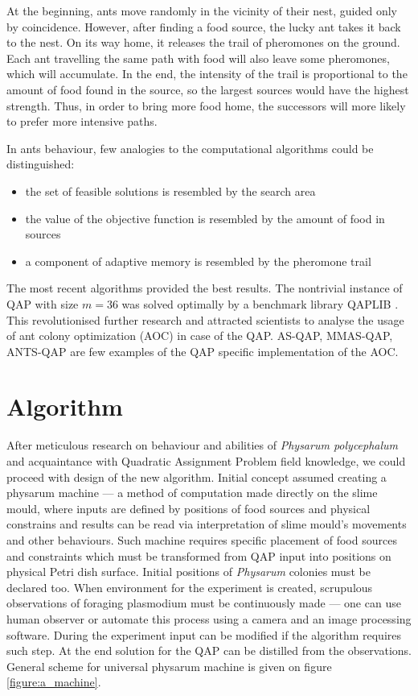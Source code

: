 \documentclass[english,a4paper,twoside]{ppfcmthesis}
\begin{document}
At the beginning, ants move randomly in the vicinity of their nest, guided only by coincidence.
However, after finding a food source, the lucky ant takes it back to the nest.
On its way home, it releases the trail of pheromones on the ground.
Each ant travelling the same path with food will also leave some pheromones, which will accumulate.
In the end, the intensity of the trail is proportional to the amount of food found in the source, so the largest sources would have the highest strength.
Thus, in order to bring more food home, the successors will more likely to prefer more intensive paths.

In ants behaviour, few analogies to the computational algorithms could be distinguished:
\begin{itemize}
  \item the set of feasible solutions is resembled by the search area
  \item the value of the objective function is resembled by the amount of food in sources
  \item a component of adaptive memory is resembled by the pheromone trail
\end{itemize}

The most recent algorithms provided the best results.
The nontrivial instance of QAP with size $ m = 36 $ was solved optimally by a benchmark library QAPLIB \cite{dorigo2004ant}.
This revolutionised further research and attracted scientists to analyse the usage of ant colony optimization (AOC) in case of the QAP.
AS-QAP, MMAS-QAP, ANTS-QAP are few examples of the QAP specific implementation of the AOC.


\chapter{Algorithm}
\label{chapter:algorithm}

After meticulous research on behaviour and abilities of \textit{Physarum polycephalum} and acquaintance with Quadratic Assignment Problem field knowledge, we could proceed with design of the new algorithm. Initial concept assumed creating a physarum machine --- a method of computation made directly on the slime mould, where inputs are defined by positions of food sources and physical constrains and results can be read via interpretation of slime mould's movements and other behaviours. Such machine requires specific placement of food sources and constraints which must be transformed from QAP input into positions on physical Petri dish surface. Initial positions of \textit{Physarum} colonies must be declared too. When environment for the experiment is created, scrupulous observations of foraging plasmodium must be continuously made --- one can use human observer or automate this process using a camera and an image processing software. During the experiment input can be modified if the algorithm requires such step. At the end solution for the QAP can be distilled from the observations. General scheme for universal physarum machine is given on figure \ref{figure:a_machine}.
\end{document}
